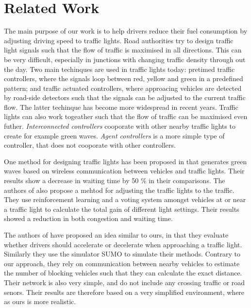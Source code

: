 \section{Related Work}

The main purpose of our work is to help drivers reduce their fuel consumption by adjusting driving speed to traffic lights.
Road authorities try to design traffic light signals such that the flow of traffic is maximised in all directions.
This can be very difficult, especially in junctions with changing traffic density through out the day.
Two main techinques are used in traffic lights today: pretimed traffic controllers, where the signals loop between red, yellow and green in a predefined pattern; and traffic actuated controllers, where approacing vehicles are detected by road-side detectors such that the signals can be adjusted to the current traffic flow.
The latter techinque has become more widespread in recent years. %
Traffic lights can also work togeather such that the flow of traffic can be maximised even futher. 
\textit{Interconnected controllers} cooporate with other nearby traffic lights to create for example green waves.
\textit{Agent controllers} is a more simple type of controller, that does not cooporate with other controllers.

One method for designing traffic lights has been proposed in \cite{SOTL} that generates green waves based on wireless communication between vehicles and traffic lights. Their results show a decrease in waiting time by 50 \% in their comparisons.
The authors of \cite{ITLC} also propose a mehtod for adjusting the traffic lights to the traffic. They use reinforcement learning and a voting system amongst vehicles at or near a traffic light to calculate the total gain of different light settings. Their results showed a reduction in both congestion and waiting time.

The authors of \cite{VANETsim} have proposed an idea similar to ours, in that they evaluate whether drivers should accelerate or decelerate when approaching a traffic light.
Similarly they use the simulator SUMO to simulate their methods. 
Contrary to our approach, they rely on communication between nearby vehicles to estimate the number of blocking vehicles such that they can calculate the exact distance.
Their network is also very simple, and do not include any crossing traffic or road senors. 
Their results are therefore based on a very simplified environment, where as ours is more realistic.

